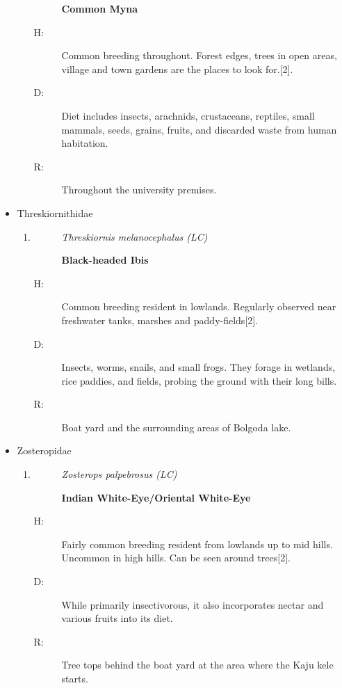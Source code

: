 \begin{itemize}
\begin{enumerate}
\begin{description}
\textbf{Common Myna}%
\end{description}%
\begin{description}%
\item[H: ]%
Common breeding throughout. Forest edges, trees in open areas, village and town gardens are the places to look for.{[}2{]}.%
\item[D: ]%
Diet includes insects, arachnids, crustaceans, reptiles, small mammals, seeds, grains, fruits, and discarded waste from human habitation.%
\item[R: ]%
Throughout the university premises.%
\end{description}%
\end{enumerate}%
\item%
Threskiornithidae%
\begin{enumerate}%
\item%
\begin{description}%
\item[]%
\textit{Threskiornis melanocephalus (LC)}%
\item[]%
\textbf{Black{-}headed Ibis}%
\end{description}%
\begin{description}%
\item[H: ]%
Common breeding resident in lowlands. Regularly observed near freshwater tanks, marshes and paddy-fields{[}2{]}.%
\item[D: ]%
Insects, worms, snails, and small frogs. They forage in wetlands, rice paddies, and fields, probing the ground with their long bills.%
\item[R: ]%
Boat yard and the surrounding areas of Bolgoda lake.%
\end{description}%
\end{enumerate}%
\item%
Zosteropidae%
\begin{enumerate}%
\item%
\begin{description}%
\item[]%
\textit{Zosterops palpebrosus (LC)}%
\item[]%
\textbf{Indian White{-}Eye/Oriental White{-}Eye}%
\end{description}%
\begin{description}%
\item[H: ]%
Fairly common breeding resident from lowlands up to mid hills. Uncommon in high hills. Can be seen around trees{[}2{]}.%
\item[D: ]%
While primarily insectivorous, it also incorporates nectar and various fruits into its diet.%
\item[R: ]%
Tree tops behind the boat yard at the area where the Kaju kele starts.%
\end{description}%
\end{enumerate}%
\end{itemize}
